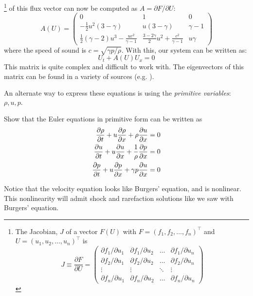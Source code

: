 \footnote{
The Jacobian, $J$ of a vector $F(U)$ with $F = (f_1, f_2, \ldots, f_n)^\intercal$ and
$U = (u_1, u_2, \ldots, u_n)^\intercal$ is 
\begin{equation*}
J \equiv \frac{\partial F}{\partial U} = \left (
  \begin{array}{cccc}
     \partial f_1/\partial u_1 & \partial f_1/\partial u_2 & \ldots & \partial f_1/\partial u_n \\
     \partial f_2/\partial u_1 & \partial f_2/\partial u_2 & \ldots & \partial f_2/\partial u_n \\
     \vdots                    & \vdots                    & \ddots & \vdots \\
     \partial f_n/\partial u_1 & \partial f_n/\partial u_2 & \ldots & \partial f_n/\partial u_n 
  \end{array} \right )
\end{equation*}
}
of this flux vector can now be computed as $A = \partial
F/\partial U$:
\begin{equation}
A(U) = \left ( \begin{array}{ccc}
   0  & 1 & 0 \\
   -\frac{1}{2}u^2(3 -\gamma) & u (3 -\gamma) & \gamma - 1 \\
   \frac{1}{2}(\gamma -2)u^3 - \frac{uc^2}{\gamma -1} &
       \frac{3-2\gamma}{2} u^2 + \frac{c^2}{\gamma -1} & u \gamma
  \end{array} \right )
\end{equation}
where the speed of sound is $c = \sqrt{\gamma p/\rho}$.   With this, our
system can be written as:
\begin{equation}
U_t + A(U) U_x = 0
\end{equation}
This matrix is quite complex and difficult to work with.  The
eigenvectors of this matrix can be found in a variety of sources
(e.g. \cite{toro:1997,athena}).


An alternate way to express these equations is using the {\em
  primitive variables}: $\rho, u, p$.
\begin{exercise}
{Show that the Euler equations in primitive form can
  be written as
\begin{align}
{\frac{{\partial\rho}}{\partial t}} + u {\frac{{\partial\rho}}{\partial x}} + \rho {\frac{{\partial u}}{\partial x}} &= 0 \\
{\frac{{\partial u}}{\partial t}} + u {\frac{{\partial u}}{\partial x}} + \frac{1}{\rho} {\frac{{\partial p}}{\partial x}} &= 0 \\
{\frac{{\partial p}}{\partial t}} + u {\frac{{\partial p}}{\partial x}} + \gamma p {\frac{{\partial u}}{\partial x}} &= 0
\end{align}
}
\end{exercise}
Notice that the velocity equation looks like Burgers' equation, and 
is nonlinear.  This nonlinearity will admit shock and rarefaction
solutions like we saw with Burgers' equation.

